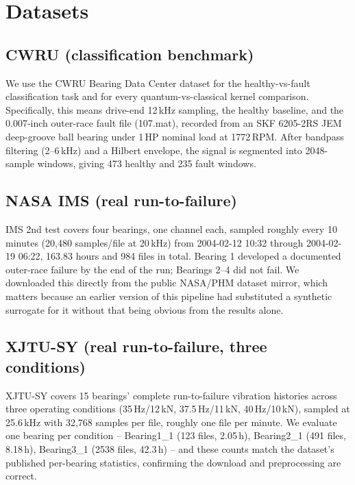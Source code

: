 \documentclass[3p,times,procedia]{elsarticle}
\begin{document}
\section{Datasets}

\subsection{CWRU (classification benchmark)}
We use the CWRU Bearing Data Center dataset for the healthy-vs-fault classification task and for every quantum-vs-classical kernel comparison. Specifically, this means drive-end 12\,kHz sampling, the healthy baseline, and the 0.007-inch outer-race fault file (107.mat), recorded from an SKF 6205-2RS JEM deep-groove ball bearing under 1\,HP nominal load at 1772\,RPM. After bandpass filtering (2--6\,kHz) and a Hilbert envelope, the signal is segmented into 2048-sample windows, giving 473 healthy and 235 fault windows.

\subsection{NASA IMS (real run-to-failure)}
IMS 2nd test covers four bearings, one channel each, sampled roughly every 10 minutes (20,480 samples/file at 20\,kHz) from 2004-02-12 10:32 through 2004-02-19 06:22, 163.83 hours and 984 files in total. Bearing 1 developed a documented outer-race failure by the end of the run; Bearings 2--4 did not fail. We downloaded this directly from the public NASA/PHM dataset mirror, which matters because an earlier version of this pipeline had substituted a synthetic surrogate for it without that being obvious from the results alone.

\subsection{XJTU-SY (real run-to-failure, three conditions)}
XJTU-SY covers 15 bearings' complete run-to-failure vibration histories across three operating conditions (35\,Hz/12\,kN, 37.5\,Hz/11\,kN, 40\,Hz/10\,kN), sampled at 25.6\,kHz with 32,768 samples per file, roughly one file per minute. We evaluate one bearing per condition -- Bearing1\_1 (123 files, 2.05\,h), Bearing2\_1 (491 files, 8.18\,h), Bearing3\_1 (2538 files, 42.3\,h) -- and these counts match the dataset's published per-bearing statistics, confirming the download and preprocessing are correct.

\end{document}
